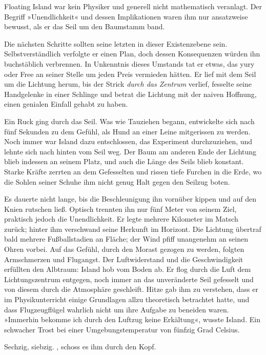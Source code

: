 Floating Island war kein Physiker und generell nicht mathematisch veranlagt. Der Begriff »Unendlichkeit« und dessen Implikationen waren ihm nur ansatzweise bewusst, als er das Seil um den Baumstamm band.

Die nächsten Schritte sollten seine letzten in dieser Existenzebene sein. Selbstverständlich verfolgte er einen Plan, doch dessen Konsequenzen würden ihn buchstäblich verbrennen. In Unkenntnis dieses Umstands tat er etwas, das yury oder Free an seiner Stelle um jeden Preis vermieden hätten. Er lief mit dem Seil um die Lichtung herum, bis der Strick \emph{durch das Zentrum} verlief, fesselte seine Handgelenke in einer Schlinge und betrat die Lichtung mit der naiven Hoffnung, einen genialen Einfall gehabt zu haben.

Ein Ruck ging durch das Seil. Was wie Tauziehen begann, entwickelte sich nach fünf Sekunden zu dem Gefühl, als Hund an einer Leine mitgerissen zu werden. Noch immer war Island dazu entschlossen, das Experiment durchzuziehen, und lehnte sich nach hinten vom Seil weg. Der Baum am anderen Ende der Lichtung blieb indessen an seinem Platz, und auch die Länge des Seils blieb konstant. Starke Kräfte zerrten an dem Gefesselten und rissen tiefe Furchen in die Erde, wo die Sohlen seiner Schuhe ihm nicht genug Halt gegen den Seilzug boten.

Es dauerte nicht lange, bis die Beschleunigung ihn vornüber kippen und auf den Knien rutschen ließ. Optisch trennten ihn nur fünf Meter von seinem Ziel, praktisch jedoch die Unendlichkeit. Er legte mehrere Kilometer im Matsch zurück; hinter ihm verschwand seine Herkunft im Horizont. Die Lichtung übertraf bald mehrere Fußballstadien an Fläche; der Wind pfiff unangenehm an seinen Ohren vorbei. Auf das Gefühl, durch den Morast gezogen zu werden, folgten Armschmerzen und Flugangst. Der Luftwiderstand und die Geschwindigkeit erfüllten den Albtraum: Island hob vom Boden ab. Er flog durch die Luft dem Lichtungszentrum entgegen, noch immer an das unveränderte Seil gefesselt und von diesem durch die Atmosphäre geschleift. Hitze gab ihm zu verstehen, dass er im Physikunterricht einige Grundlagen allzu theoretisch betrachtet hatte, und dass Flugzeugflügel wahrlich nicht um ihre Aufgabe zu beneiden waren. »Immerhin bekomme ich durch den Luftzug keine Erkältung«, wusste Island. Ein schwacher Trost bei einer Umgebungstemperatur von fünfzig Grad Celsius.

Sechzig, siebzig. , schoss es ihm durch den Kopf. 

